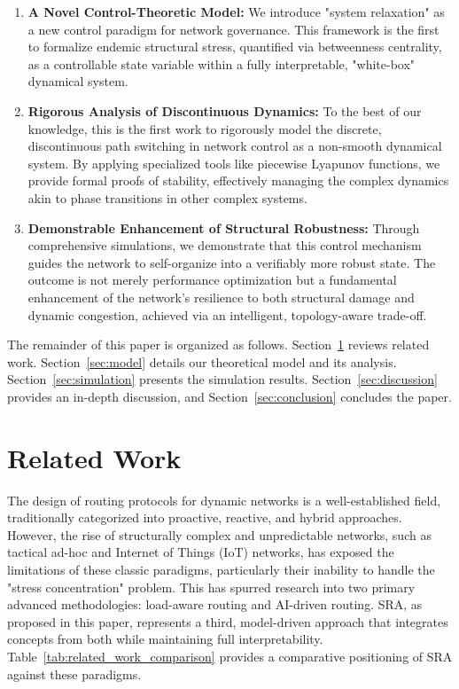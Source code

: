 \documentclass[journal]{IEEEtran}
\begin{document}
\begin{enumerate}
    \item \textbf{A Novel Control-Theoretic Model:} We introduce "system relaxation" as a new control paradigm for network governance. This framework is the first to formalize endemic structural stress, quantified via betweenness centrality, as a controllable state variable within a fully interpretable, "white-box" dynamical system.

    \item \textbf{Rigorous Analysis of Discontinuous Dynamics:} To the best of our knowledge, this is the first work to rigorously model the discrete, discontinuous path switching in network control as a non-smooth dynamical system. By applying specialized tools like piecewise Lyapunov functions, we provide formal proofs of stability, effectively managing the complex dynamics akin to phase transitions in other complex systems.

    \item \textbf{Demonstrable Enhancement of Structural Robustness:} Through comprehensive simulations, we demonstrate that this control mechanism guides the network to self-organize into a verifiably more robust state. The outcome is not merely performance optimization but a fundamental enhancement of the network's resilience to both structural damage and dynamic congestion, achieved via an intelligent, topology-aware trade-off.
\end{enumerate}

The remainder of this paper is organized as follows. Section~\ref{sec:related_work} reviews related work. Section~\ref{sec:model} details our theoretical model and its analysis. Section~\ref{sec:simulation} presents the simulation results. Section~\ref{sec:discussion} provides an in-depth discussion, and Section~\ref{sec:conclusion} concludes the paper.


\section{Related Work}
\label{sec:related_work}

The design of routing protocols for dynamic networks is a well-established field, traditionally categorized into proactive, reactive, and hybrid approaches. However, the rise of structurally complex and unpredictable networks, such as tactical ad-hoc and Internet of Things (IoT) networks, has exposed the limitations of these classic paradigms, particularly their inability to handle the "stress concentration" problem. This has spurred research into two primary advanced methodologies: load-aware routing and AI-driven routing. SRA, as proposed in this paper, represents a third, model-driven approach that integrates concepts from both while maintaining full interpretability. Table~\ref{tab:related_work_comparison} provides a comparative positioning of SRA against these paradigms.
\end{document}
